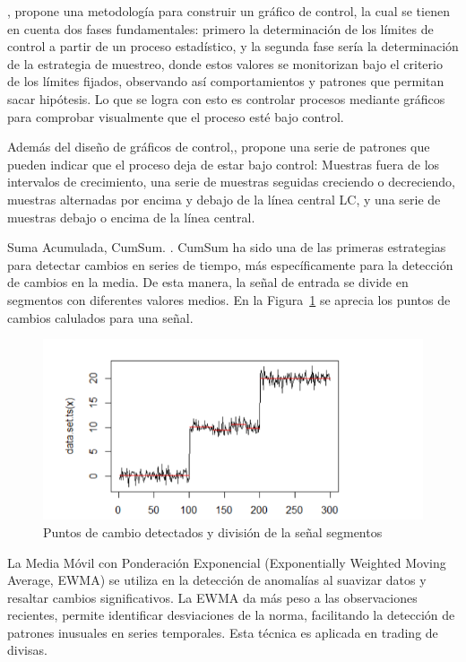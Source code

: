 \documentclass[11pt,a4paper,spanish]{book}
\numberwithin{equation}{chapter}
\numberwithin{figure}{chapter}
\begin{document}
\cite{lopezcano2023spc}, propone una metodología para construir un gráfico de control, la cual  se tienen en cuenta dos fases fundamentales: primero la determinación de los límites de control a partir de un proceso estadístico, y la segunda fase sería la determinación de la estrategia de muestreo, donde estos valores se monitorizan bajo el criterio de los límites fijados, observando así comportamientos y patrones que permitan sacar hipótesis. Lo que se logra con esto es controlar procesos mediante gráficos para comprobar visualmente que el proceso esté bajo control.

Además del diseño de gráficos de control,\cite{lopezcano2023spc}, propone una serie de patrones que pueden indicar que el proceso deja de estar bajo control: Muestras fuera de los intervalos de crecimiento, una serie de muestras seguidas creciendo o decreciendo, muestras alternadas por encima y debajo de la línea central LC, y una serie de muestras debajo o encima de la línea central. 

Suma Acumulada, CumSum. \cite{contreras2024cusum}. CumSum ha sido una de las primeras estrategias para detectar cambios en series de tiempo, más específicamente para la detección de cambios en la media. De esta manera, la señal de entrada se divide en segmentos con diferentes valores medios. En la Figura~\ref{fig:figPuntosCambiosSegmentos} se aprecia los puntos de cambios calulados para una señal. 


\begin{figure}[h]
    \centering
    \includegraphics[width=1.0\textwidth]{media/puntos-cambios-segmenteos.png}
    \caption{Puntos de cambio detectados y división de la señal segmentos  \protect\cite{contreras2024cusum} }
    \label{fig:figPuntosCambiosSegmentos}
\end{figure}


La Media Móvil con Ponderación Exponencial (Exponentially Weighted Moving Average, EWMA) \cite{fan1996ewma} se utiliza en la detección de anomalías al suavizar datos y resaltar cambios significativos. La EWMA da más peso a las observaciones recientes, permite identificar desviaciones de la norma, facilitando la detección de patrones inusuales en series temporales. Esta técnica es aplicada en trading de divisas. 
\end{document}
